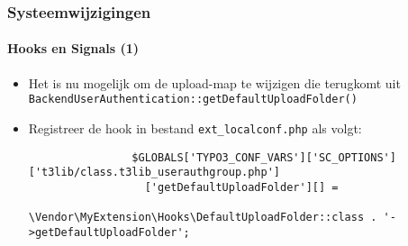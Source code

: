 \begin{frame}[fragile]
	\frametitle{Systeemwijzigingen}
	\framesubtitle{Hooks en Signals (1)}

	\lstset{basicstyle=\tiny\ttfamily}

	\begin{itemize}

		\item Het is nu mogelijk om de upload-map te wijzigen die terugkomt uit
			\texttt{BackendUserAuthentication::getDefaultUploadFolder()}

		\item Registreer de hook in bestand \texttt{ext\_localconf.php} als volgt:

			\begin{lstlisting}
				$GLOBALS['TYPO3_CONF_VARS']['SC_OPTIONS']['t3lib/class.t3lib_userauthgroup.php']
				  ['getDefaultUploadFolder'][] =
				  \Vendor\MyExtension\Hooks\DefaultUploadFolder::class . '->getDefaultUploadFolder';
			\end{lstlisting}

	\end{itemize}

\end{frame}

